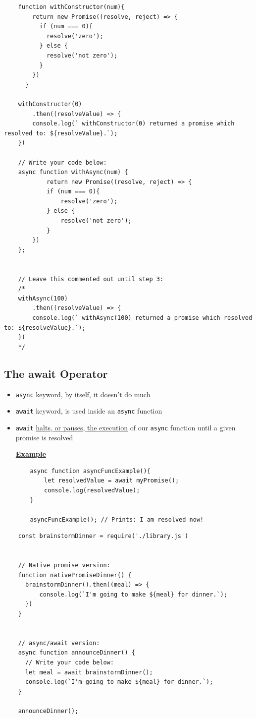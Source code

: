 \documentclass[12pt]{article}
\begin{document}
\begin{lstlisting}
    function withConstructor(num){
        return new Promise((resolve, reject) => {
          if (num === 0){
            resolve('zero');
          } else {
            resolve('not zero');
          }
        })
      }

    withConstructor(0)
        .then((resolveValue) => {
        console.log(` withConstructor(0) returned a promise which resolved to: ${resolveValue}.`);
    })

    // Write your code below:
    async function withAsync(num) {
            return new Promise((resolve, reject) => {
            if (num === 0){
                resolve('zero');
            } else {
                resolve('not zero');
            }
        })
    };


    // Leave this commented out until step 3:
    /*
    withAsync(100)
        .then((resolveValue) => {
        console.log(` withAsync(100) returned a promise which resolved to: ${resolveValue}.`);
    })
    */
\end{lstlisting}

\subsection{The await Operator}
\begin{itemize}
    \item \texttt{async} keyword, by itself, it doesn’t do much
    \item \texttt{await} keyword, is used inside an \texttt{async} function
    \item \texttt{await} \ul{halts, or pauses, the execution} of our \texttt{async} function until a given promise is resolved

    \bigskip

    \underline{\textbf{Example}}

    \begin{lstlisting}
    async function asyncFuncExample(){
        let resolvedValue = await myPromise();
        console.log(resolvedValue);
    }

    asyncFuncExample(); // Prints: I am resolved now!
    \end{lstlisting}

\end{itemize}

\begin{lstlisting}
    const brainstormDinner = require('./library.js')


    // Native promise version:
    function nativePromiseDinner() {
      brainstormDinner().then((meal) => {
          console.log(`I'm going to make ${meal} for dinner.`);
      })
    }


    // async/await version:
    async function announceDinner() {
      // Write your code below:
      let meal = await brainstormDinner();
      console.log(`I'm going to make ${meal} for dinner.`);
    }

    announceDinner();
\end{lstlisting}
\end{document}
